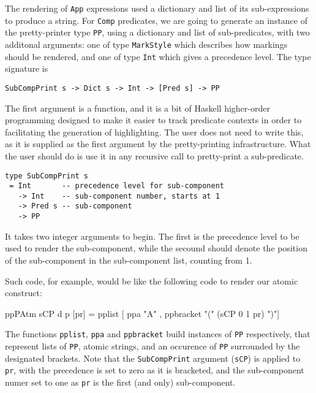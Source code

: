 The rendering of \texttt{App} expressions used a dictionary and list of its
sub-expressions to produce a string.
For \texttt{Comp} predicates, we are going to generate an instance
of the pretty-printer type \texttt{PP}, using a dictionary
and list of sub-predicates,
with two additonal arguments:
one of type \texttt{MarkStyle} which describes how markings should be rendered,
and one of type \texttt{Int} which gives a precedence level.
The type signature is
\begin{verbatim}
SubCompPrint s -> Dict s -> Int -> [Pred s] -> PP
\end{verbatim}
The first argument is a function,
and it is a bit of Haskell higher-order programming designed
to make it easier to track predicate contexts in order
to facilitating the generation of highlighting.
The user does not need to write this,
as it is supplied as the first argument by the pretty-printing
infrastructure.
What the user should do is use it in any recursive call
to pretty-print a sub-predicate.
\begin{verbatim}
type SubCompPrint s
 = Int       -- precedence level for sub-component
   -> Int    -- sub-component number, starts at 1
   -> Pred s -- sub-component
   -> PP 
\end{verbatim}
It takes two integer arguments to begin.
The first is the precedence level to be used to render the
sub-component,
while the secound should denote the position of the sub-component
in the sub-component list, counting from 1.

Such code, for example, would be like the following code
to render our atomic construct:
\begin{code}
ppPAtm sCP d p [pr]
 = pplist [ ppa "A"
          , ppbracket "(" (sCP 0 1 pr) ")"]
\end{code}
The functions \texttt{pplist}, \texttt{ppa} and \texttt{ppbracket}
build instances of \texttt{PP} respectively,
that represent lists of \texttt{PP},
atomic strings,
and an occurence of \texttt{PP} surrounded by the designated brackets.
Note that the \texttt{SubCompPrint} argument (\texttt{sCP})
is applied to \texttt{pr},
with the precedence is set to zero as it is bracketed,
and the sub-component numer set to one as \texttt{pr} is the first
(and only) sub-component.



